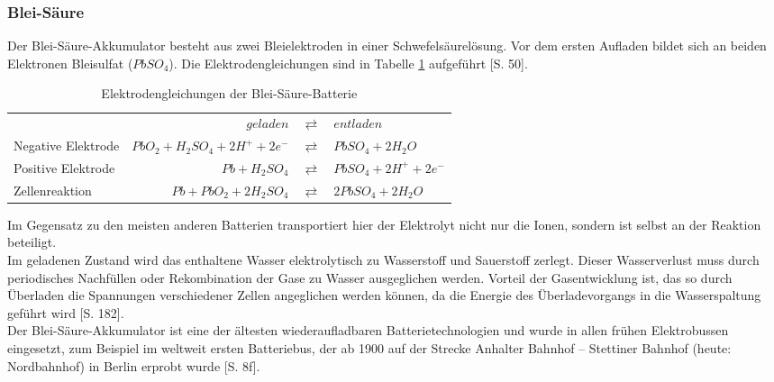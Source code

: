 \subsubsection{Blei-Säure}
Der Blei-Säure-Akkumulator besteht aus zwei Bleielektroden in einer Schwefelsäurelösung. Vor dem ersten Aufladen bildet sich an beiden Elektronen Bleisulfat ($PbSO_4$). Die Elektrodengleichungen sind in Tabelle \ref{Pb} aufgeführt \cite{KiehneBattery}[S. 50].\\
\begin{table}\centering
  \begin{tabularx}{\linewidth}{XrcX}
  	                   &                       $geladen$ & $\rightleftarrows$ & $entladen$             \\
  	Negative Elektrode & $PbO_2 + H_2SO_4 + 2H^+ + 2e^-$ & $\rightleftarrows$ & $PbSO_4 + 2H_2O$       \\
  	Positive Elektrode &                  $Pb + H_2SO_4$ & $\rightleftarrows$ & $PbSO_4 + 2H^+ + 2e^-$ \\ \midrule
  	Zellenreaktion     &         $Pb + PbO_2 + 2H_2SO_4$ & $\rightleftarrows$ & $2PbSO_4 + 2H_2O$      \\
  \end{tabularx}
  \caption{Elektrodengleichungen der Blei-Säure-Batterie}
  \label{Pb}
\end{table}
Im Gegensatz zu den meisten anderen Batterien transportiert hier der Elektrolyt nicht nur die Ionen, sondern ist selbst an der Reaktion beteiligt.\\
Im geladenen Zustand wird das enthaltene Wasser elektrolytisch zu Wasserstoff und Sauerstoff zerlegt. Dieser Wasserverlust muss durch periodisches Nachfüllen oder Rekombination der Gase zu Wasser ausgeglichen werden. Vorteil der Gasentwicklung ist, das so durch Überladen die Spannungen verschiedener Zellen angeglichen werden können, da die Energie des Überladevorgangs in die Wasserspaltung geführt wird \cite{tub_aleph001746639}[S. 182].\\
Der Blei-Säure-Akkumulator ist eine der ältesten wiederaufladbaren Batterietechnologien und wurde in allen frühen Elektrobussen eingesetzt, zum Beispiel im weltweit ersten Batteriebus, der ab 1900 auf der Strecke Anhalter Bahnhof – Stettiner Bahnhof (heute: Nordbahnhof) in Berlin erprobt wurde \cite{Risch:1957}[S. 8f].

